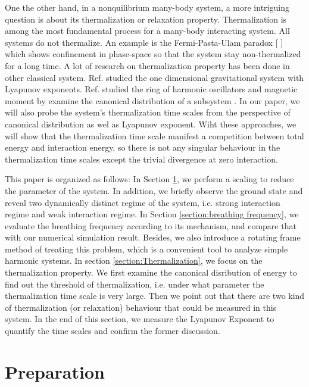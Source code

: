 \documentclass[aps,pre,twocolumn,groupedaddress]{revtex4-1}
\begin{document}
One the other hand, in a nonquilibrium many-body system, a more intriguing question is about its thermalization or relaxation property. Thermalization is among the most fundamental process for a many-body interacting system. All systems do not thermalize. An example is the Fermi-Pasta-Ulam paradox [ ] which shows confinement in phase-space so that the system stay non-thermalized for a long time. A lot of research on thermalization property has been done in other classical system. Ref.\cite{Tsuchiya2000}\cite{Yawn1997} studied the one dimensional gravitational system with Lyapunov exponents. Ref.\cite{Jin2013} studied the ring of harmonic oscillators and magnetic moment by examine the canonical distribution of a subsystem . In our paper, we will also probe the system's thermalization time scales from the perspective of canonical distribution as wel as Lyapunov exponent. Wiht these approaches, we will show that the thermalization time scale manifest a competition between total energy and interaction energy, so there is not any singular behaviour in the thermalization time scales except the trivial divergence at zero interaction.

This paper is organized as follows: In Section \ref{section:preparation}, we perform a scaling to reduce the parameter of the system. In addition, we briefly observe the ground state and reveal two dynamically distinct regime of the system, i.e. strong interaction regime and weak interaction regime. In Section \ref{section:breathing frequency}, we evaluate the breathing frequency according to its mechanism, and compare that with our numerical simulation result. Besides, we also introduce a rotating frame method of treating this problem, which is a convenient tool to analyze simple harmonic systems. In section \ref{section:Thermalization}, we focus on the thermalization property. We first examine the canonical disribution of energy to find out the threshold of thermalization, i.e. under what parameter the thermalization time scale is very large. Then we point out that there are two kind of thermalization (or relaxation) behaviour that could be measured in this system. In the end of this section, we measure the Lyapunov Exponent to quantify the time scales and confirm the former discussion.


\section{Preparation}\label{section:preparation}
\end{document}
